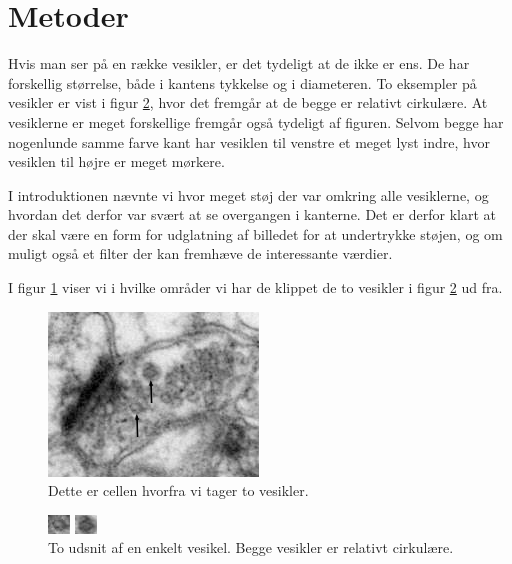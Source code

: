 \thispagestyle{plain}
\section{Metoder}
\pagestyle{headings}
Hvis man ser på en række vesikler, er det tydeligt at de ikke er ens. De har forskellig størrelse, både i kantens tykkelse og i diameteren. To eksempler på vesikler er vist i figur \ref{fig:premethod_ves1}, hvor det fremgår at de begge er relativt cirkulære. At vesiklerne er meget forskellige fremgår også tydeligt af figuren. Selvom begge har nogenlunde samme farve kant har vesiklen til venstre et meget lyst indre, hvor vesiklen til højre er meget mørkere. 

I introduktionen nævnte vi hvor meget støj der var omkring alle vesiklerne, og hvordan det derfor var svært at se overgangen i kanterne. Det er derfor klart at der skal være en form for udglatning af billedet for at undertrykke støjen, og om muligt også et filter der kan fremhæve de interessante værdier.

I figur \ref{fig:premethod_daddy} viser vi i hvilke områder vi har de klippet de to vesikler i figur \ref{fig:premethod_ves1} ud fra.

\begin{figure}[H]
	\centering
	\includegraphics[scale=3]{files/premethod/img/ves_color_daddy.png}
	\caption{Dette er cellen hvorfra vi tager to vesikler.\label{fig:premethod_daddy}}
\end{figure}

\begin{figure}[H]
	\begin{minipage}[b]{0.5\linewidth}
		\centering
		\includegraphics[scale=5]{files/premethod/img/ves1.png}
	\end{minipage}
	\hspace{0.5cm}
	\begin{minipage}[b]{0.5\linewidth}
		\centering
		\includegraphics[scale=5]{files/premethod/img/ves2.png}
	\end{minipage}
	\caption{To udsnit af en enkelt vesikel. Begge vesikler er relativt cirkulære.\label{fig:premethod_ves1}}
\end{figure}

